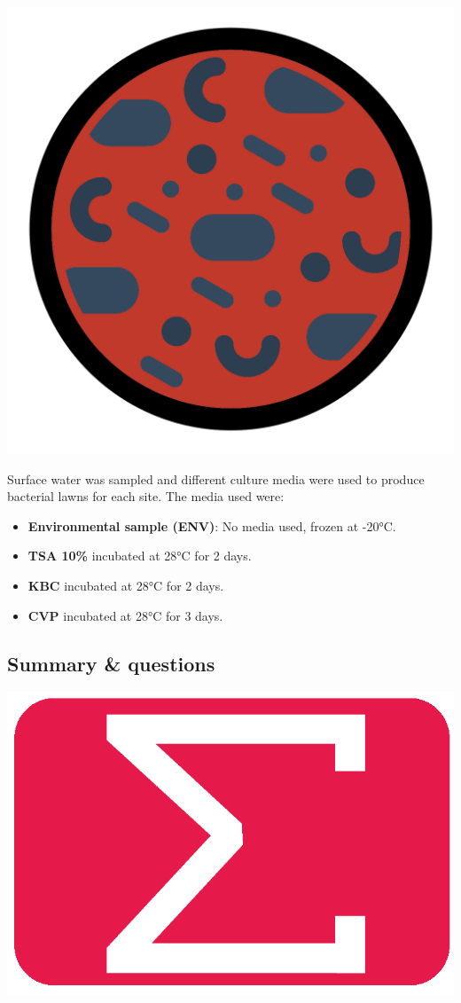 \documentclass[
]{book}
\providecommand{\tightlist}{%
  \setlength{\itemsep}{0pt}\setlength{\parskip}{0pt}}
\begin{document}
\includegraphics{figures/petri.png}

Surface water was sampled and different culture media were used to produce bacterial lawns for each site. The media used were:

\begin{itemize}
\tightlist
\item
  \textbf{Environmental sample (ENV)}: No media used, frozen at -20°C.
\item
  \textbf{TSA 10\%} incubated at 28°C for 2 days.
\item
  \textbf{KBC} incubated at 28°C for 2 days.
\item
  \textbf{CVP} incubated at 28°C for 3 days.
\end{itemize}

\hypertarget{sum_and_qs}{%
\subsection{Summary \& questions}\label{sum_and_qs}}

\includegraphics{figures/sum_red.png}
\end{document}
